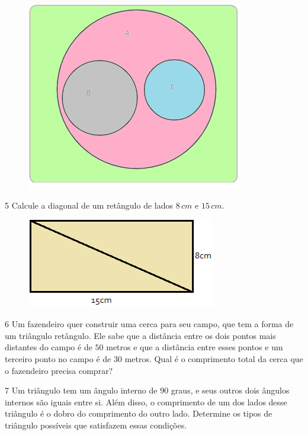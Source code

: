 \begin{figure}
\includegraphics[width=3.70833in,height=3.22917in]{./imgSAEB_6_MAT/media/image54.png}
\end{figure}

\num{5}  Calcule a diagonal de um retângulo de lados $8\,cm$ e $15\,cm$.

\begin{figure}
\includegraphics[width=3.24444in,height=1.54653in]{./imgSAEB_6_MAT/media/image55.png}
\end{figure}


\num{6}  Um fazendeiro quer construir uma cerca para seu campo, que tem a
forma de um triângulo retângulo. Ele sabe que a distância entre os dois
pontos mais distantes do campo é de $50$ metros e que a distância entre
esses pontos e um terceiro ponto no campo é de $30$ metros. Qual é o
comprimento total da cerca que o fazendeiro precisa comprar?


\num{7}  Um triângulo tem um ângulo interno de $90$ graus, e seus outros dois
ângulos internos são iguais entre si. Além disso, o comprimento de um
dos lados desse triângulo é o dobro do comprimento do outro lado.
Determine os tipos de triângulo possíveis que satisfazem essas
condições.

